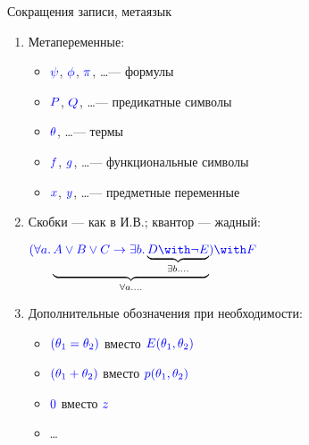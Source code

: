\documentclass[aspectratio=169]{beamer}
\begin{document}
\begin{frame}{Сокращения записи, метаязык}

\begin{enumerate}
\item Метапеременные:
\begin{itemize}
\item $\color{blue}\psi$, $\color{blue}\phi$, $\color{blue}\pi$, \dots --- формулы
\item $\color{blue}P$, $\color{blue}Q$, \dots --- предикатные символы
\item $\color{blue}\theta$, \dots --- термы
\item $\color{blue}f$, $\color{blue}g$, \dots --- функциональные символы
\item $\color{blue}x$, $\color{blue}y$, \dots --- предметные переменные
\end{itemize}\pause

\item Скобки --- как в И.В.; квантор --- жадный:
\begin{center}${\color{blue}(\forall a.} \underbrace{{\color{blue}A \vee B \vee C \rightarrow \exists b.}
                    \underbrace{\color{blue}D \with \neg E}_{\exists b.\dots}}_{\forall a.\dots} \color{blue}) \with F$\end{center}
\pause

\item Дополнительные обозначения при необходимости:
\begin{itemize}
\item $\color{blue}(\theta_1 = \theta_2)$ вместо $\color{blue}E(\theta_1,\theta_2)$
\item $\color{blue}(\theta_1 + \theta_2)$ вместо $\color{blue}p(\theta_1,\theta_2)$
\item $\color{blue}0$ вместо $\color{blue}z$
\item \dots
\end{itemize}

\end{enumerate}

\end{frame}
\end{document}
